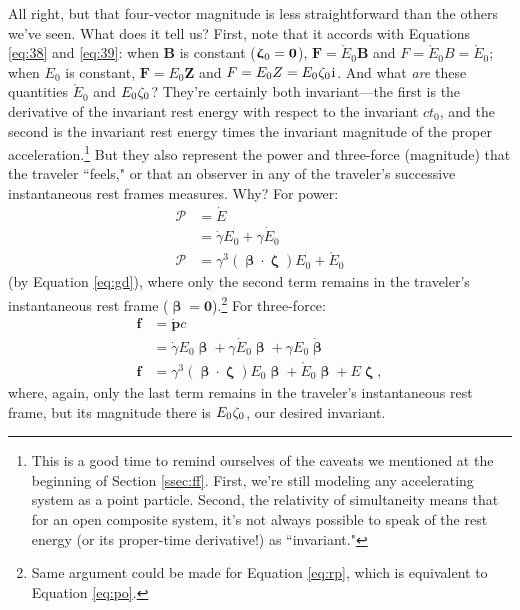 \documentclass[12pt]{article}
\renewcommand{\vv}[1]{\mathbf{#1}}
\newcommand{\vvbeta}{\bm{\upbeta}}
\newcommand{\vvzeta}{\bm{\upzeta}}
\begin{document}
All right, but that four-vector magnitude is less straightforward than the others we've seen. What does it tell us? First, note that it accords with Equations \ref{eq:38} and \ref{eq:39}: when $\vv B$ is constant ($\vvzeta_{\mkern1mu 0} = \vv 0$), $\vv F = \mathring{E}_0 \vv B$ and $F = \mathring{E}_0 B = \mathring{E}_0$; when $E_0$ is constant, $\vv F = E_0 \vv Z$ and $F = E_0 Z = E_0 \mkern.5mu \zeta_0 \mkern1mu \mathrm{i}$. And what \emph{are} these quantities $\mathring{E}_0$ and $E_0 \mkern.5mu \zeta_0$? They're certainly both invariant---the first is the derivative of the invariant rest energy with respect to the invariant $c t_0$, and the second is the invariant rest energy times the invariant magnitude of the proper acceleration.\footnote{This is a good time to remind ourselves of the caveats we mentioned at the beginning of Section \ref{ssec:ff}. First, we're still modeling any accelerating system as a point particle. Second, the relativity of simultaneity means that for an open composite system, it's not always possible to speak of the rest energy (or its proper-time derivative!) as ``invariant."} But they also represent the power and three-force (magnitude) that the traveler ``feels," or that an observer in any of the traveler's successive instantaneous rest frames measures. Why? For power:
\begin{equation}\label{eq:po}
\begin{split}
\mathcal{P} &= \dot{E}\\
&= \dot{\gamma} E_0 + \gamma \dot{E}_0\\
\mathcal{P} &= \gamma^3 (\vvbeta \cdot \vvzeta) E_0 + \mathring{E}_0
\end{split}
\end{equation}
(by Equation \ref{eq:gd}), where only the second term remains in the traveler's instantaneous rest frame ($\vvbeta = \vv 0$).\footnote{Same argument could be made for Equation \ref{eq:rp}, which is equivalent to Equation \ref{eq:po}.} For three-force:
\begin{equation}\label{eq:41}
\begin{split}
\vv f &= \dot{\vv p} c\\
&= \dot{\gamma} E_0 \vvbeta + \gamma \dot{E}_0 \vvbeta + \gamma E_0 \dot{\vvbeta}\\
\vv f &=\gamma^3 (\vvbeta \cdot \vvzeta) E_0 \vvbeta + \mathring{E}_0 \vvbeta + E \vvzeta,
\end{split}
\end{equation}
where, again, only the last term remains in the traveler's instantaneous rest frame, but its magnitude there is $E_0 \mkern.5mu \zeta_0$, our desired invariant.
\end{document}
